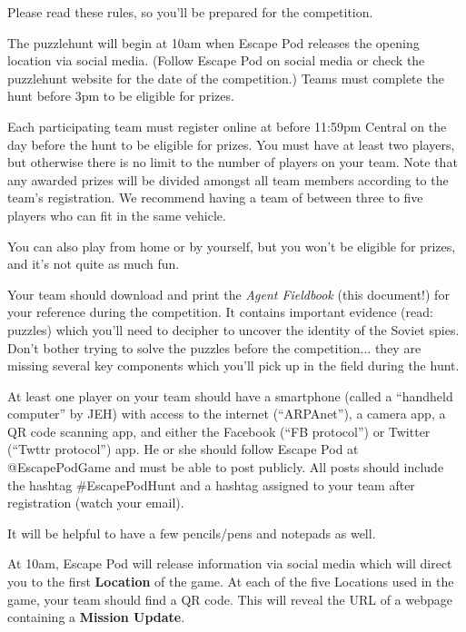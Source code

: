 \documentclass{puzzlehunt}
\begin{document}
Please read these rules, so you'll be prepared for the competition.


The puzzlehunt will begin at 10am when Escape Pod releases the opening location
via social media. (Follow Escape Pod on social media or
check the puzzlehunt website for the date of the competition.) Teams must
complete the hunt before 3pm to be eligible for prizes.


Each participating team must register online at
before 11:59pm Central on the day before the hunt to be eligible for prizes.
You must have at least two
players, but otherwise there is no limit to the
number of players on your team. Note that any awarded prizes will be divided amongst
all team members according to the team's registration. We recommend having
a team of between three to five players who can fit in the same vehicle.

You can also play from home or by yourself, but you won't be eligible for prizes, and
it's not quite as much fun.


Your team should download and print the \textit{Agent Fieldbook} (this document!)
for your reference during the competition. It contains important evidence
(read: puzzles) which you'll need to decipher to uncover the identity of the
Soviet spies. Don't bother trying to solve the puzzles before the competition...
they are missing several key components which you'll pick up in the field during
the hunt.

At least one player on your team should have a smartphone (called a
``handheld computer'' by JEH) with access to the
internet (``ARPAnet''), a camera app, a QR code scanning app, and either
the Facebook (``FB protocol'') or Twitter (``Twttr protocol'') app.
He or she should follow Escape Pod at @EscapePodGame and must be able
to post publicly. All posts should include the hashtag \#EscapePodHunt
and a hashtag assigned to your team after registration (watch your email).

It will be helpful to have a few pencils/pens and notepads as well.


At 10am, Escape Pod will release information via social media which will direct
you to the first \textbf{Location} of the game. At each of the five Locations used
in the game, your team should find a QR code. This will reveal the URL of a
webpage containing a \textbf{Mission Update}.
\end{document}
